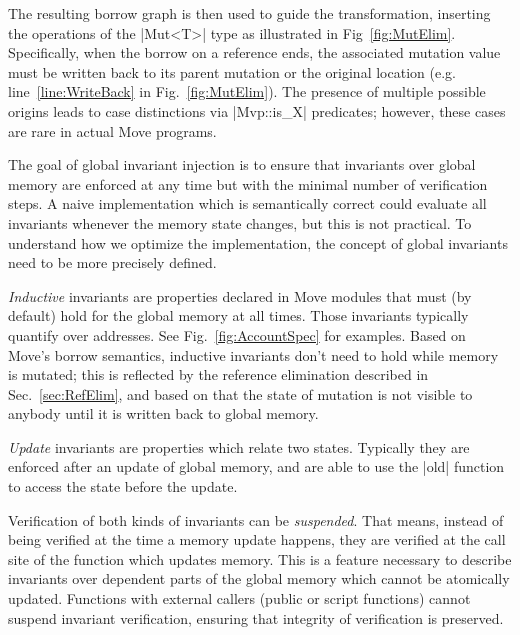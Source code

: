 The resulting borrow graph is then used to guide the transformation, inserting
the operations of the |Mut<T>| type as illustrated in
Fig~\ref{fig:MutElim}. Specifically, when the borrow on a reference ends, the
associated mutation value must be written back to its parent mutation or the
original location (e.g. line~\ref{line:WriteBack} in
Fig.~\ref{fig:MutElim}). The presence of multiple possible origins leads to case
distinctions via |Mvp::is_X| predicates; however, these cases are rare in actual
Move programs.



\label{sec:GlobalInvariants}

The goal of global invariant injection is to ensure that invariants over global
memory are enforced at any time but with the minimal number of verification
steps.  A naive implementation which is semantically correct could evaluate all
invariants whenever the memory state changes, but this is not practical.  To
understand how we optimize the implementation, the concept of global invariants
need to be more precisely defined.


\emph{Inductive} invariants are properties declared in Move modules that must
(by default) hold for the global memory at all times. Those invariants typically
quantify over addresses.  See Fig.~\ref{fig:AccountSpec} for examples. Based on
Move's borrow semantics, inductive invariants don't need to hold while memory is
mutated; this is reflected by the reference elimination described in
Sec.~\ref{sec:RefElim}, and based on that the state of mutation is not visible
to anybody until it is written back to global memory.

\emph{Update} invariants are properties which relate two states.  Typically they
are enforced after an update of global memory, and are able to use the |old|
function to access the state before the update.

Verification of both kinds of invariants can be \emph{suspended}. That means,
instead of being verified at the time a memory update happens, they are verified
at the call site of the function which updates memory. This is a feature
necessary to describe invariants over dependent parts of the global memory which
cannot be atomically updated.  Functions with external callers (public or script
functions) cannot suspend invariant verification, ensuring that integrity of
verification is preserved.


